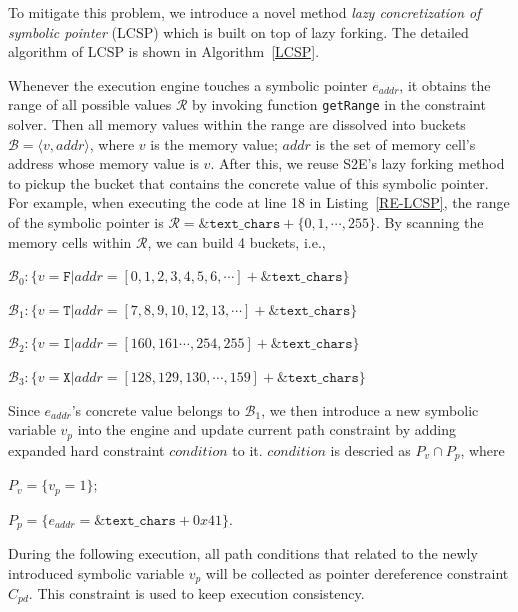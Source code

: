 \documentclass{cta-author}
\begin{document}
To mitigate this problem, we introduce a novel method 
\emph{lazy concretization of symbolic pointer} (LCSP) 
which is built on top of lazy forking. The detailed algorithm 
of LCSP is shown in Algorithm~\ref{LCSP}.


 

Whenever the execution engine touches a symbolic pointer $e_{addr}$, it obtains 
the range of all possible values $\mathcal{R}$ by invoking function \texttt{getRange} 
in the constraint solver. Then all memory values within the range are dissolved
into buckets $\mathcal{B}=\langle v, addr\rangle$, where $v$ is the memory value; $addr$
is the set of memory cell's address whose memory value is $v$.
After this, we reuse S2E's lazy forking method to pickup 
the bucket that contains the concrete value of this symbolic pointer.
For example, when executing the code at line 18 in Listing~\ref{RE-LCSP}, the range of 
the symbolic pointer is $\mathcal{R}=\texttt{\&text\_chars}+\{0, 1,\cdots, 255\}$.
By scanning the memory cells within $\mathcal{R}$, we can build 4 buckets, i.e., 

$\mathcal{B}_0:\{v=\texttt{F}| addr=[0,1,2,3,4,5,6,\cdots]+\texttt{\&text\_chars}\}$

$\mathcal{B}_1:\{v=\texttt{T}| addr=[7,8,9,10,12,13,\cdots]+\texttt{\&text\_chars}\}$

$\mathcal{B}_2:\{v=\texttt{I}| addr=[160,161\cdots,254,255]+\texttt{\&text\_chars}\}$

$\mathcal{B}_3:\{v=\texttt{X}| addr=[128,129,130,\cdots,159]+\texttt{\&text\_chars}\}$

Since $e_{addr}$'s concrete value belongs to $\mathcal{B}_1$, we then
introduce a new symbolic variable $v_p$ into the engine and update current path constraint by adding expanded hard constraint $condition$ to it. 
$condition$ is descried as $P_v\cap P_p$, where


$P_v=\{v_p=1\}$; 

$P_p=\{e_{addr}=\&\texttt{text\_chars}+0x41\}$.

During the following execution, all path conditions that related to the newly
introduced symbolic variable $v_p$ will be collected as pointer dereference constraint
$C_{pd}$.
This constraint is used to keep execution consistency.
\end{document}
